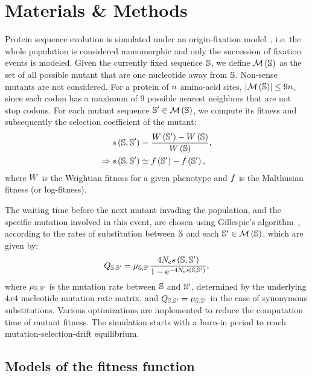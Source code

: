 \documentclass{article}
\begin{document}
\section{Materials \& Methods}
Protein sequence evolution is simulated under an origin-fixation model~\citep{McCandlish2014}, i.e. the whole population is considered monomorphic and only the succession of fixation events is modeled.
Given the currently fixed sequence $\mathbb{S}$, we define $\mathcal{M}\left(\mathbb{S}\right)$ as the set of all possible mutant that are one nucleotide away from $\mathbb{S}$.
Non-sense mutants are not considered.
For a protein of $n$ amino-acid sites, $\left| \mathcal{M}\left(\mathbb{S}\right) \right| \leq 9 n$, since each {codon} has a maximum of $9$ possible nearest neighbors that are not stop {codons}.
For each mutant sequence $\mathbb{S}' \in \mathcal{M}\left(\mathbb{S}\right)$, we compute its fitness and subsequently the selection coefficient of the mutant:
\begin{align}
    s \left( \mathbb{S},\mathbb{S}'\right) & = \dfrac{ W \left(\mathbb{S}' \right) - W \left(\mathbb{S}\right) }{ W \left( \mathbb{S}\right)}, \\
    \Rightarrow s \left( \mathbb{S},\mathbb{S}'\right) & \simeq  f \left(\mathbb{S}' \right) -   f \left(\mathbb{S}' \right),
\end{align}
where $W$ is the Wrightian fitness for a given {phenotype} and $f $ is the Malthusian fitness (or log-fitness).

The waiting time before the next mutant invading the population, and the specific mutation involved in this event, are chosen using Gillespie’s algorithm~\citep{Gillespie1977}, according to the rates of {substitution} between $\mathbb{S}$ and each $\mathbb{S}' \in \mathcal{M}\left(\mathbb{S}\right)$, which are given by:
\begin{equation}
    Q_{\mathbb{S}, \mathbb{S}'} = \mu_{\mathbb{S}, \mathbb{S}'} \dfrac{4 N_{\text{e}} s \left( \mathbb{S},\mathbb{S}'\right)}{1 - \text{e}^{-4 N_{\text{e}} s \left( \mathbb{S},\mathbb{S}'\right)}},
\end{equation}
where $\mu_{\mathbb{S}, \mathbb{S}'}$ is the mutation rate between $\mathbb{S}$ and $\mathbb{S}'$, determined by the underlying $4x4$ nucleotide mutation rate matrix, and ${Q_{\mathbb{S}, \mathbb{S}'}} = \mu_{\mathbb{S}, \mathbb{S}'}$ in the case of {synonymous} {substitutions}.
Various optimizations are implemented to reduce the computation time of mutant fitness.
The simulation starts with a burn-in period to reach mutation-selection-drift equilibrium.

\subsection{Models of the fitness function}
\label{MatMet:folding}
\end{document}
